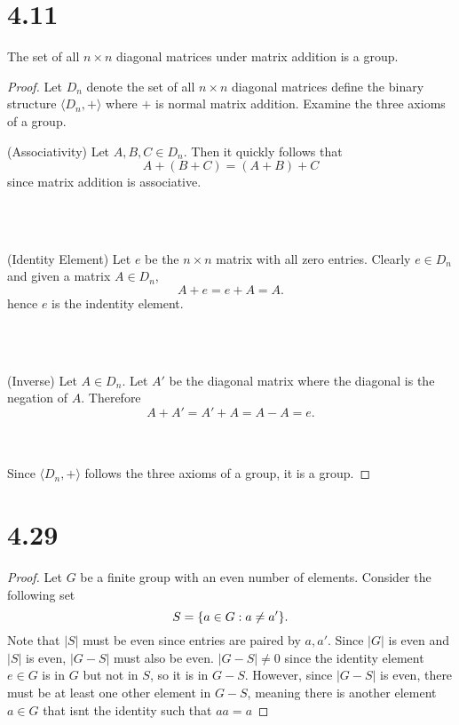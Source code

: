 \documentclass[12pt]{extarticle}
\begin{document}
\section*{4.11}
The set of all $n \times n$ diagonal matrices under matrix addition is a group.

\begin{proof}
	Let $D_n$ denote the set of all $n \times n$ diagonal matrices define the binary structure $\langle D_n, + \rangle$ where $+$ is normal matrix addition. Examine the three axioms of a group. \\

	\quad\begin{minipage}{\dimexpr\textwidth-2cm}
		(Associativity)\quad
		Let $A, B, C \in D_n$. Then it quickly follows that
		\[
			A + (B + C) = (A + B) + C
		\]
		since matrix addition is associative.
	\end{minipage} \\
	\\

	\quad\begin{minipage}{\dimexpr\textwidth-2cm}
		(Identity Element)\quad
		Let $e$ be the $n \times n$ matrix with all zero entries. Clearly $e \in D_n$ and given a matrix $A \in D_n$,
		\[
			A + e = e + A = A
		.\]
		hence $e$ is the indentity element.
	\end{minipage} \\
	\\

	\quad\begin{minipage}{\dimexpr\textwidth-2cm}
		(Inverse)\quad
		Let $A \in D_n$. Let $A'$ be the diagonal matrix where the diagonal is the negation of $A$. Therefore
		\[
			A + A' = A' + A = A - A = e
		.\]
	\end{minipage} \\
	\\

	Since $\langle D_n, + \rangle$ follows the three axioms of a group, it is a group.
\end{proof}

\section*{4.29}
\begin{proof}
	Let $G$ be a finite group with an even number of elements. Consider the following set
	\[
		S = \qty{a \in G : a \neq a'}
	.\]
	Note that $|S|$ must be even since entries are paired by $a, a'$. Since $|G|$ is even and $|S|$ is even, $|G - S|$ must also be even. $|G - S| \neq 0$ since the identity element $e \in G$ is in $G$ but not in $S$, so it is in $G - S$. However, since $|G - S|$ is even, there must be at least one other element in $G - S$, meaning there is another element $a \in G$ that isnt the identity such that $aa = a$
\end{proof}
\end{document}
